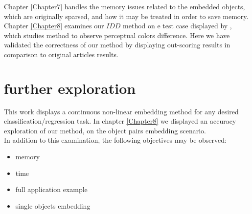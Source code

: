 Chapter \ref{Chapter7} handles the memory issues related to the embedded objects, which are originally sparsed, and how it may be treated in order to save memory.\\

Chapter \ref{Chapter8} examines our $IDD$ method on e test case displayed by \cite{perp_color}, which studies method to observe perceptual colors difference. Here we have validated the correctness of our method by displaying out-scoring results in comparison to original articles results.

\break
\section{further exploration}

This work displays a continuous non-linear embedding method for any desired classification/regression task. In chapter \ref{Chapter8} we displayed an accuracy exploration of our method, on the object pairs embedding scenario. \\In addition to this examination, the following objectives may be observed:
\begin{itemize}
	\item memory 
	\item time	
	\item full application example
	\item single objects embedding
\end{itemize}

